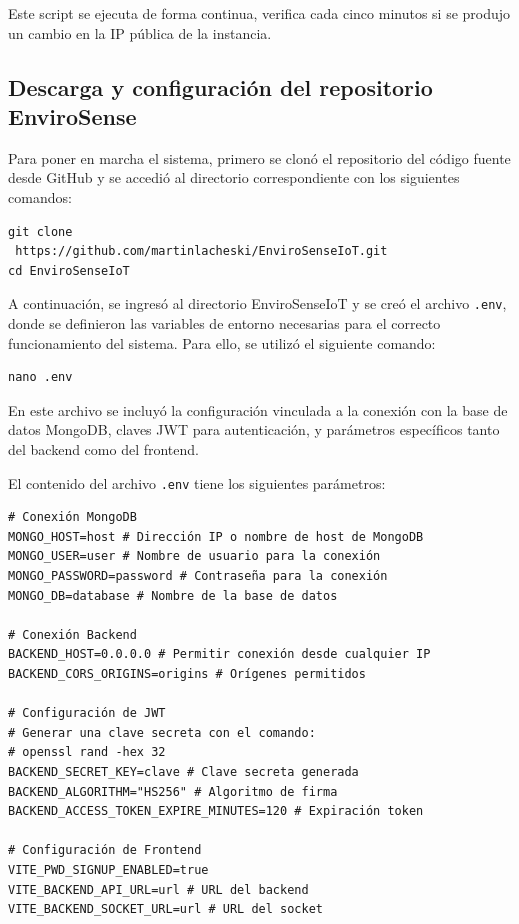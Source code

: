 Este script se ejecuta de forma continua, verifica cada cinco minutos si se
produjo un cambio en la IP pública de la instancia.

\subsection{Descarga y configuración del repositorio EnviroSense}

Para poner en marcha el sistema, primero se clonó el repositorio del código
fuente desde GitHub y se accedió al directorio correspondiente con los
siguientes comandos:

\begin{verbatim}
git clone 
 https://github.com/martinlacheski/EnviroSenseIoT.git
cd EnviroSenseIoT
\end{verbatim}

A continuación, se ingresó al directorio EnviroSenseIoT y se creó el archivo
\texttt{.env}, donde se definieron las variables de entorno necesarias para el
correcto funcionamiento del sistema. Para ello, se utilizó el siguiente
comando:

\begin{verbatim}
nano .env
\end{verbatim}

En este archivo se incluyó la configuración vinculada a la conexión con la base
de datos MongoDB, claves JWT para autenticación, y parámetros específicos tanto
del backend como del frontend.

El contenido del archivo \texttt{.env} tiene los siguientes parámetros:
\begin{verbatim}
# Conexión MongoDB
MONGO_HOST=host # Dirección IP o nombre de host de MongoDB
MONGO_USER=user # Nombre de usuario para la conexión
MONGO_PASSWORD=password # Contraseña para la conexión
MONGO_DB=database # Nombre de la base de datos
    
# Conexión Backend
BACKEND_HOST=0.0.0.0 # Permitir conexión desde cualquier IP
BACKEND_CORS_ORIGINS=origins # Orígenes permitidos
    
# Configuración de JWT
# Generar una clave secreta con el comando: 
# openssl rand -hex 32
BACKEND_SECRET_KEY=clave # Clave secreta generada
BACKEND_ALGORITHM="HS256" # Algoritmo de firma
BACKEND_ACCESS_TOKEN_EXPIRE_MINUTES=120 # Expiración token

# Configuración de Frontend
VITE_PWD_SIGNUP_ENABLED=true
VITE_BACKEND_API_URL=url # URL del backend
VITE_BACKEND_SOCKET_URL=url # URL del socket
\end{verbatim}

